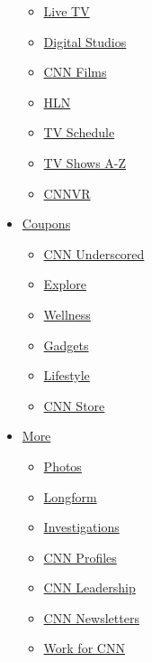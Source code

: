 \begin{itemize}
  \begin{itemize}
  \tightlist
  \item
    \href{//cnn.it/go2}{Live TV}
  \item
    \href{/specials/digital-studios}{Digital Studios}
  \item
    \href{/specials/videos/digital-shorts}{CNN Films}
  \item
    \href{/specials/videos/hln}{HLN}
  \item
    \href{/tv/schedule/cnn}{TV Schedule}
  \item
    \href{/specials/tv/all-shows}{TV Shows A-Z}
  \item
    \href{/vr}{CNNVR}
  \end{itemize}
\item
  \href{//coupons.cnn.com}{Coupons}

  \begin{itemize}
  \tightlist
  \item
    \href{/cnn-underscored/}{CNN Underscored}
  \item
    \href{/specials/cnn-underscored/explore/}{Explore}
  \item
    \href{/specials/cnn-underscored/wellness/}{Wellness}
  \item
    \href{/specials/cnn-underscored/gadgets/}{Gadgets}
  \item
    \href{/specials/cnn-underscored/lifestyle/}{Lifestyle}
  \item
    \href{//store.cnn.com/?utm_source=cnn.com\&utm_medium=referral\&utm_campaign=navbar}{CNN
    Store}
  \end{itemize}
\item
  \href{/more}{More}

  \begin{itemize}
  \tightlist
  \item
    \href{/specials/photos}{Photos}
  \item
    \href{/specials/cnn-longform}{Longform}
  \item
    \href{/specials/cnn-investigates}{Investigations}
  \item
    \href{/specials/profiles}{CNN Profiles}
  \item
    \href{/specials/more/cnn-leadership}{CNN Leadership}
  \item
    \href{/email/subscription}{CNN Newsletters}
  \item
    \href{https://www.turnerjobs.com/search-jobs?orgIds=1174\&ac=19299}{Work
    for CNN}
  \end{itemize}
\end{itemize}

